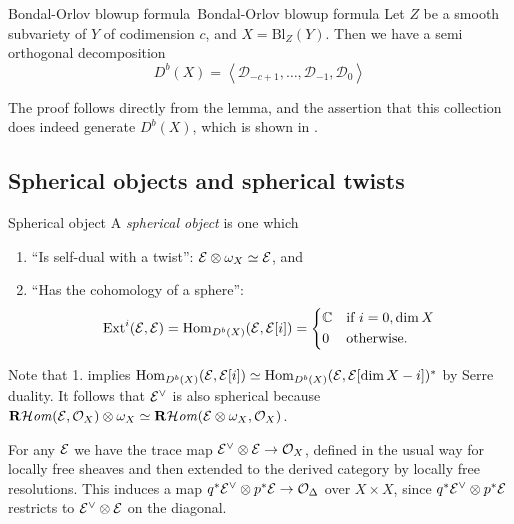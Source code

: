 \begin{theorem}[label=thm:blowupformula]{Bondal-Orlov blowup formula~\cite*{bondal_semiorthogonal_1995}}{Bondal-Orlov blowup formula}
    Let $Z$ be a smooth subvariety of $Y$ of codimension $c$, and $X = \mathrm{Bl}_{Z}(Y)$. Then we have a semi orthogonal decomposition $$ D^b(X) = \left< \mathcal{D}_{-c+1},\dots,\mathcal{D}_{-1}, \mathcal{D}_0 \right> $$
\end{theorem}

The proof follows directly from the lemma, and the assertion that this collection does indeed generate $D^b(X)$, which is shown in \cite{orlov_projective_1993}.

\subsection{Spherical objects and spherical twists}

\begin{definition}{Spherical object}{}
    A \emph{spherical object} is one which
    \begin{enumerate}
        \item ``Is self-dual with a twist'': $\mathcal{E}\otimes\omega_X\simeq\mathcal{E}$, and
        \item ``Has the cohomology of a sphere'':
            \begin{equation*}
                \Ext^i(\calE,\calE)
                    = \Hom_{D^b(X)}(\calE,\calE[i])
                    = \begin{cases*}
                        \C & if $i=0,\dim X$ \\
                        0 & otherwise.
                    \end{cases*}
            \end{equation*}
    \end{enumerate}
\end{definition}

Note that 1. implies $\operatorname{Hom}_{D^b(X)}(\mathcal{E},\mathcal{E}[i])\simeq\operatorname{Hom}_{D^b(X)}(\mathcal{E},\mathcal{E}[\dim X-i])^*$
by Serre duality. It follows that $\mathcal{E}^\vee$ is also spherical because
$\operatorname{\mathbf{R}\mathcal{H}\mathit{om}}(\mathcal{E},\mathcal{O}_X)\otimes\omega_X\simeq\operatorname{\mathbf{R}\mathcal{H}\mathit{om}}(\mathcal{E}\otimes\omega_X,\mathcal{O}_X)$.

For any $\mathcal{E}$ we have the trace map $\mathcal{E}^\vee\otimes\mathcal{E}\to\mathcal{O}_X$, defined
in the usual way for locally free sheaves and then extended to the derived
category by locally free resolutions. This induces a map
$q^*\mathcal{E}^\vee\otimes p^*\mathcal{E}\to\mathcal{O}_\Delta$ over $X\times X$, since
$q^*\mathcal{E}^\vee\otimes p^*\mathcal{E}$ restricts to $\mathcal{E}^\vee\otimes\mathcal{E}$ on the
diagonal.

